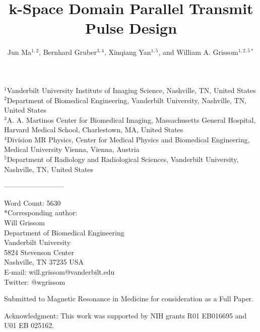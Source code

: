 \documentclass[11pt]{article}
\begin{document}
\title{k-Space Domain Parallel Transmit Pulse Design}
\author{Jun Ma$^{1,2}$, Bernhard Gruber$^{3,4}$, Xinqiang Yan$^{1,5}$, and William A. Grissom$^{1,2,5*}$}
\maketitle
\begin{flushleft}
\vspace{-0.5cm}
$^1$Vanderbilt University Institute of Imaging Science, Nashville, TN, United States\\
$^2$Department of Biomedical Engineering, Vanderbilt University, Nashville, TN, United States\\
$^3$A. A. Martinos Center for Biomedical Imaging, Massachusetts General Hospital, Harvard Medical School, Charlestown, MA, United States\\
$^4$Division MR Physics, Center for Medical Physics and Biomedical Engineering, Medical University Vienna, Vienna, Austria\\
$^5$Department of Radiology and Radiological Sciences, Vanderbilt University, Nashville, TN, United States\\    

\par
-------------------------- 

\par
Word Count: 5630 \\
*Corresponding author: \\
Will Grissom\\
Department of Biomedical Engineering\\
Vanderbilt University\\
5824 Stevenson Center\\
Nashville, TN 37235 USA \\
E-mail: will.grissom@vanderbilt.edu \\
Twitter: @wgrissom

\par Submitted to Magnetic Resonance in Medicine for consideration as a Full Paper.

\par
Acknowledgment: This work was supported by NIH grants R01 EB016695 and U01 EB 025162.

\end{flushleft}
\thispagestyle{plain}

\pagebreak

\end{document}
